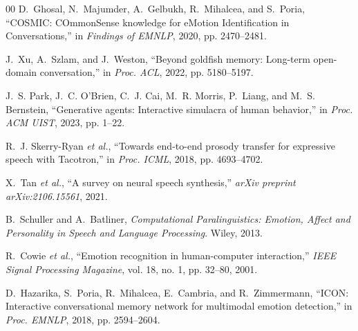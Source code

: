 \documentclass[conference]{IEEEtran}
\begin{document}
\begin{thebibliography}{00}
D.~Ghosal, N.~Majumder, A.~Gelbukh, R.~Mihalcea, and S.~Poria, ``COSMIC: COmmonSense knowledge for eMotion Identification in Conversations,'' in \textit{Findings of EMNLP}, 2020, pp. 2470--2481.

J.~Xu, A.~Szlam, and J.~Weston, ``Beyond goldfish memory: Long-term open-domain conversation,'' in \textit{Proc. ACL}, 2022, pp. 5180--5197.

J.~S. Park, J.~C. O'Brien, C.~J. Cai, M.~R. Morris, P.~Liang, and M.~S. Bernstein, ``Generative agents: Interactive simulacra of human behavior,'' in \textit{Proc. ACM UIST}, 2023, pp. 1--22.

R.~J. Skerry-Ryan \textit{et al.}, ``Towards end-to-end prosody transfer for expressive speech with Tacotron,'' in \textit{Proc. ICML}, 2018, pp. 4693--4702.

X.~Tan \textit{et al.}, ``A survey on neural speech synthesis,'' \textit{arXiv preprint arXiv:2106.15561}, 2021.

B.~Schuller and A.~Batliner, \textit{Computational Paralinguistics: Emotion, Affect and Personality in Speech and Language Processing}. Wiley, 2013.

R.~Cowie \textit{et al.}, ``Emotion recognition in human-computer interaction,'' \textit{IEEE Signal Processing Magazine}, vol. 18, no. 1, pp. 32--80, 2001.

D.~Hazarika, S.~Poria, R.~Mihalcea, E.~Cambria, and R.~Zimmermann, ``ICON: Interactive conversational memory network for multimodal emotion detection,'' in \textit{Proc. EMNLP}, 2018, pp. 2594--2604.

\end{thebibliography}
\end{document}
